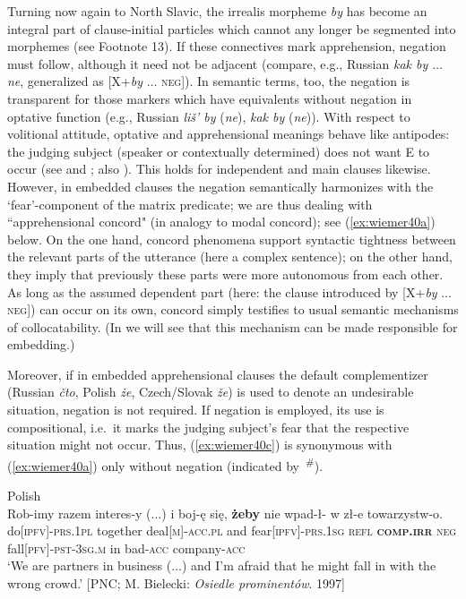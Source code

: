 \documentclass[output=paper,colorlinks,citecolor=brown]{langscibook}
\begin{document}
 Turning now again to North Slavic, the irrealis morpheme \textit{by} has become an integral part of clause-initial particles which cannot any longer be segmented into morphemes (see Footnote 13). If these connectives mark apprehension, negation must follow, although it need not be adjacent (compare, e.g., Russian \textit{kak by $
\ldots$ ne}, generalized as [X+\textit{by} \textsc{$\ldots$ neg}]). In semantic terms, too, the negation is transparent for those markers which have equivalents without negation in optative function (e.g., Russian \textit{liš' by} (\textit{ne}), \textit{kak by} (\textit{ne})). With respect to volitional attitude, optative and apprehensional meanings behave like antipodes: the judging subject (speaker or contextually determined) does not want E to occur (see  and ; also \citealt[343]{Dobrushina2016}). This holds for independent and main clauses likewise. However, in embedded clauses the negation semantically harmonizes with the `fear'-component of the matrix predicate; we are thus dealing with ``apprehensional concord" (in analogy to modal concord); see (\ref{ex:wiemer40a}) below. On the one hand, concord phenomena support syntactic tightness between the relevant parts of the utterance (here a complex sentence); on the other hand, they imply that previously these parts were more autonomous from each other. As long as the assumed dependent part (here: the clause introduced by [X+\textit{by} \textsc{$\ldots$ neg}]) can occur on its own, concord simply testifies to usual semantic mechanisms of collocatability. (In  we will see that this mechanism can be made responsible for embedding.)


Moreover, if in embedded apprehensional clauses the default complementizer (Russian \textit{čto}, Polish \textit{że}, Czech/Slovak \textit{že}) is used to denote an undesirable situation, negation is not required. If negation is employed, its use is compositional, i.e.\ it marks the judging subject's fear that the respective situation might not occur. Thus, (\ref{ex:wiemer40c}) is synonymous with (\ref{ex:wiemer40a}) only without negation (indicated by~\textsuperscript{\#}).



\ea 
\label{ex:wiemer40} 
\textnormal{Polish} \\
\ea \label{ex:wiemer40a} 
\gll Rob-imy razem interes-y \textnormal{($\ldots$)}
 i boj-ę się, \textbf{żeby} nie wpad-ł-\emptyset {} w zł-e towarzystw-o. \\
do\textsc{[ipfv]-prs.1pl} together deal\textsc{[m]-acc.pl} {} and fear\textsc{[ipfv]-prs.1sg} \textsc{refl} \textbf{\textsc{comp.irr}} \textsc{neg} fall\textsc{[pfv]-pst-3sg.m} in bad-\textsc{acc} company-\textsc{acc} \\
\glt `We are partners in business ($\ldots$) and I'm afraid that he might fall in with the wrong crowd.' {[PNC; M. Bielecki: \textit{Osiedle prominentów}. 1997}]
\end{document}
